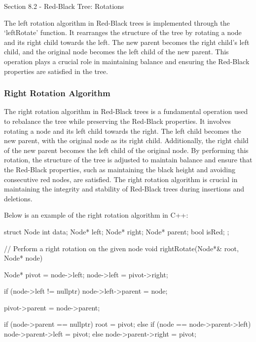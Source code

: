 \begin{notes}{Section 8.2 - Red-Black Tree: Rotations}
\begin{highlight}
        The left rotation algorithm in Red-Black trees is implemented through the `leftRotate' function. It rearranges the structure of the tree by rotating a node and its right child towards the left. The new parent becomes the right child's left child, and the original node becomes the left child of the new parent. This operation plays a crucial 
        role in maintaining balance and ensuring the Red-Black properties are satisfied in the tree.
    \end{highlight}
    
    \subsubsection{Right Rotation Algorithm}
    
    The right rotation algorithm in Red-Black trees is a fundamental operation used to rebalance the tree while preserving the Red-Black properties. It involves rotating a node and its left child towards the right. The left child becomes the new parent, with the original node as its right child. Additionally, the right child of the new parent becomes 
    the left child of the original node. By performing this rotation, the structure of the tree is adjusted to maintain balance and ensure that the Red-Black properties, such as maintaining the black height and avoiding consecutive red nodes, are satisfied. The right rotation algorithm is crucial in maintaining the integrity and stability of Red-Black 
    trees during insertions and deletions.
    
    \begin{highlight}
        Below is an example of the right rotation algorithm in C++:
    
    \begin{code}[C++]
    struct Node {
        int data;
        Node* left;
        Node* right;
        Node* parent;
        bool isRed;
    };
    
    // Perform a right rotation on the given node
    void rightRotate(Node*& root, Node* node) {
        Node* pivot = node->left;
        node->left = pivot->right;
    
        if (node->left != nullptr)
            node->left->parent = node;
    
        pivot->parent = node->parent;
    
        if (node->parent == nullptr)
            root = pivot;
        else if (node == node->parent->left)
            node->parent->left = pivot;
        else
            node->parent->right = pivot;
    
}
\end{code}
\end{highlight}
\end{notes}
